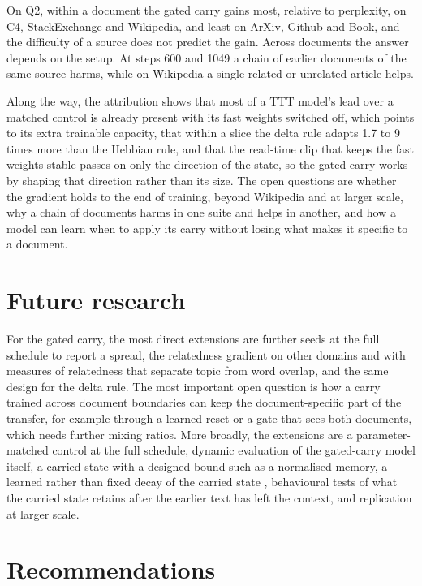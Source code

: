 \documentclass[12pt,a4paper]{report}
\begin{document}
On Q2, within a document the gated carry gains most, relative to perplexity, on C4, StackExchange and Wikipedia, and least on ArXiv, Github and Book, and the difficulty of a source does not predict the gain. Across documents the answer depends on the setup. At steps 600 and 1049 a chain of earlier documents of the same source harms, while on Wikipedia a single related or unrelated article helps.

Along the way, the attribution shows that most of a TTT model's lead over a matched control is already present with its fast weights switched off, which points to its extra trainable capacity, that within a slice the delta rule adapts 1.7 to 9 times more than the Hebbian rule, and that the read-time clip that keeps the fast weights stable passes on only the direction of the state, so the gated carry works by shaping that direction rather than its size. The open questions are whether the gradient holds to the end of training, beyond Wikipedia and at larger scale, why a chain of documents harms in one suite and helps in another, and how a model can learn when to apply its carry without losing what makes it specific to a document.

\section{Future research}

For the gated carry, the most direct extensions are further seeds at the full schedule to report a spread, the relatedness gradient on other domains and with measures of relatedness that separate topic from word overlap, and the same design for the delta rule. The most important open question is how a carry trained across document boundaries can keep the document-specific part of the transfer, for example through a learned reset or a gate that sees both documents, which needs further mixing ratios. More broadly, the extensions are a parameter-matched control at the full schedule, dynamic evaluation of the gated-carry model itself, a carried state with a designed bound such as a normalised memory, a learned rather than fixed decay of the carried state \citep{ravi2017optimization,yang2024gla}, behavioural tests of what the carried state retains after the earlier text has left the context, and replication at larger scale.

\section{Recommendations}
\end{document}
